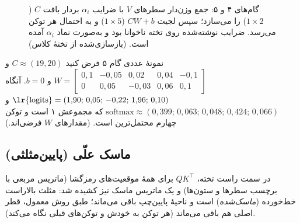 \begin{figure}[htbp]
\centering
{}
\caption{گام‌های ۴ و ۵: جمع وزن‌دار سطرهای $V$ با ضرایب $\alpha_i$ بردار بافت $C$ ($1\times2$) را می‌سازد؛ سپس لجیت $CW+b$ ($1\times5$) و  به احتمال هر توکن می‌رسد. ضرایب نوشته‌شده روی تخته ناخوانا بود و به‌صورت نماد $\alpha_i$ آمده است. (بازسازی‌شده از تختهٔ کلاس)}
\end{figure}

\begin{addedbox}{نمونهٔ عددی گام ۵}
فرض کنید $C\approx(19,20)$ و
$W=\begin{bmatrix}0{,}1&-0{,}05&0{,}02&0{,}04&-0{,}1\\0&0{,}05&-0{,}03&0{,}06&0{,}1\end{bmatrix}$ و $b=0$. آنگاه
$\text{\lr{logits}}=(1{,}90;\,0{,}05;\,-0{,}22;\,1{,}96;\,0{,}10)$ و
$\mathrm{softmax}\approx(0{,}399;\,0{,}063;\,0{,}048;\,0{,}424;\,0{,}066)$ که مجموعش ۱ است و توکن چهارم محتمل‌ترین است. (مقدارهای $W$ فرضی‌اند.)
\end{addedbox}

\subsection{ماسک علّی (پایین‌مثلثی)}
در سمت راست تخته، $QK^{\top}$ برای همهٔ موقعیت‌های رمزگشا (ماتریس مربعی با برچسب سطرها و ستون‌ها) و یک ماتریس ماسک نیز کشیده شد: مثلث بالا‌راست خط‌خورده (\emph{ماسک‌شده}) است و ناحیهٔ پایین‌چپ باقی می‌ماند؛ طبق روش معمول، قطر اصلی هم باقی می‌ماند (هر توکن به خودش و توکن‌های قبلی نگاه می‌کند).

